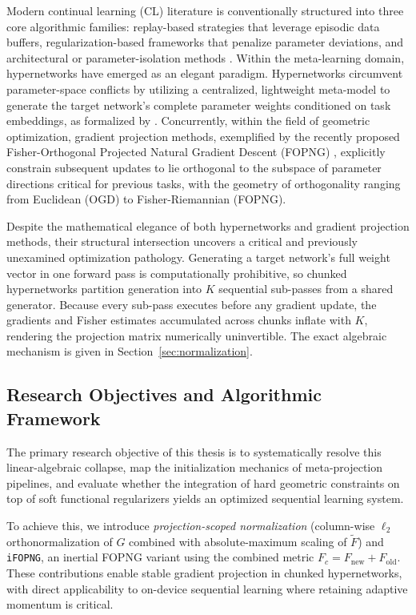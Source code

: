 Modern continual learning (CL) literature is conventionally structured into
three core algorithmic families: replay-based strategies that leverage episodic
data buffers, regularization-based frameworks that penalize parameter deviations,
and architectural or parameter-isolation methods \citep{de_lange_continual_2022}.
Within the meta-learning domain, hypernetworks \citep{ha_hypernetworks_2017}
have emerged as an elegant paradigm. Hypernetworks circumvent parameter-space
conflicts by utilizing a centralized, lightweight meta-model to generate the
target network's complete parameter weights conditioned on task embeddings, as
formalized by \citet{oswald_continual_2020}. Concurrently, within the field of
geometric optimization, gradient projection methods, exemplified by the
recently proposed Fisher-Orthogonal Projected Natural Gradient Descent (FOPNG)
\citep{garg_fisher-orthogonal_2026}, explicitly constrain subsequent updates to
lie orthogonal to the subspace of parameter directions critical for previous tasks,
with the geometry of orthogonality ranging from Euclidean (OGD) to
Fisher-Riemannian (FOPNG).

Despite the mathematical elegance of both hypernetworks and gradient projection
methods, their structural intersection uncovers a critical and previously
unexamined optimization pathology. Generating a target network's full weight
vector in one forward pass is computationally prohibitive, so chunked
hypernetworks partition generation into $K$ sequential sub-passes from a shared
generator. Because every sub-pass executes before any gradient update, the
gradients and Fisher estimates accumulated across chunks inflate with $K$,
rendering the projection matrix numerically uninvertible. The exact algebraic
mechanism is given in Section~\ref{sec:normalization}.

\subsection*{Research Objectives and Algorithmic Framework}

The primary research objective of this thesis is to systematically resolve this
linear-algebraic collapse, map the initialization mechanics of meta-projection
pipelines, and evaluate whether the integration of hard geometric constraints on
top of soft functional regularizers yields an optimized sequential learning system.

To achieve this, we introduce \emph{projection-scoped normalization}
(column-wise $\ell_2$ orthonormalization of $G$ combined with
absolute-maximum scaling of $\tilde{F}$) and \texttt{iFOPNG}, an
inertial FOPNG variant using the combined metric
$F_c = {F}_{\mathrm{new}} + {F}_{\mathrm{old}}$.
These contributions enable stable gradient projection in chunked
hypernetworks, with direct applicability to on-device sequential
learning where retaining adaptive momentum is critical.

